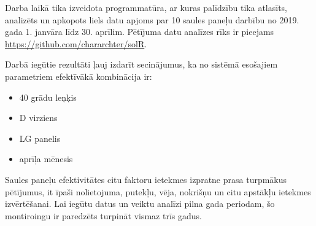 Darba laikā tika izveidota programmatūra, ar kuras palīdzību tika atlasīts, analizēts un apkopots liels datu apjoms par 10 saules paneļu darbību no 2019. gada 1. janvāra līdz 30. aprīlim. Pētījuma datu analīzes rīks ir pieejams \url{https://github.com/chararchter/solR}.

Darbā iegūtie rezultāti ļauj izdarīt secinājumus, ka no sistēmā esošajiem parametriem efektīvākā kombinācija ir:
\begin{itemize}
	\item 40 grādu leņķis
	\item D virziens
	\item LG panelis
	\item aprīļa mēnesis
\end{itemize}


Saules paneļu efektivitātes citu faktoru ietekmes izpratne prasa turpmākus pētījumus, it īpaši nolietojuma, putekļu, vēja, nokrišņu un citu apstākļu ietekmes izvērtēšanai. Lai iegūtu datus un veiktu analīzi pilna gada periodam, šo montiroingu ir paredzēts turpināt vismaz trīs gadus.